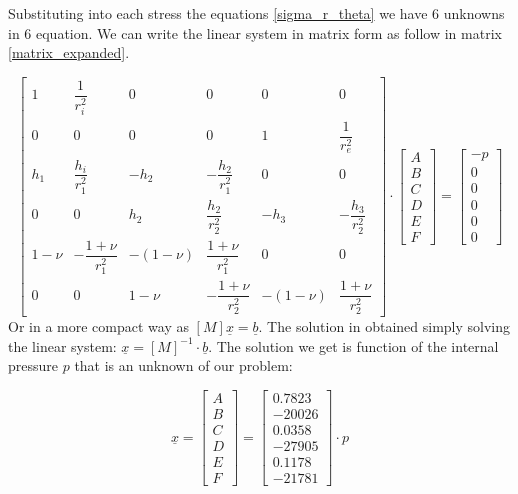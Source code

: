 \documentclass[a4paper,12pt]{article}
\begin{document}
Substituting into each stress the equations \ref{sigma_r_theta} we have 6 unknowns in 6 equation. We can write the linear system in matrix form as follow in matrix \ref{matrix_expanded}.

\begingroup
\renewcommand*{\arraystretch}{2}
\begin{equation}
\label{matrix_expanded}
\begin{bmatrix}
1     & \dfrac{1}{r_i^2}      & 0        & 0                    & 0        & 0                   \\
0     & 0                    & 0        & 0                    & 1        & \dfrac{1}{r_e^2}     \\
h_1   & \dfrac{h_i}{r_1^2}    & -h_2     & -\dfrac{h_2}{r_1^2}   & 0        & 0                   \\
0     & 0                    & h_2      & \dfrac{h_2}{r_2^2}    & -h_3     & -\dfrac{h_3}{r_2^2}  \\
1-\nu & -\dfrac{1+\nu}{r_1^2} & -(1-\nu) & \dfrac{1+\nu}{r_1^2}  & 0        & 0                   \\
0     & 0                    & 1-\nu    & -\dfrac{1+\nu}{r_2^2} & -(1-\nu) & \dfrac{1+\nu}{r_2^2}
\end{bmatrix}
\cdot
\begin{bmatrix}
A\\ B\\ C\\ D\\ E\\ F
\end{bmatrix}
=
\begin{bmatrix}
-p\\ 0\\ 0\\ 0\\ 0\\ 0
\end{bmatrix}
\end{equation}
\endgroup
%
Or in a more compact way as $[M]\underline{x}=\underline{b}$. The solution in obtained simply solving the linear system: $\underline{x}=[M]^{-1}\cdot\underline{b}$. The solution we get is function of the internal pressure $p$ that is an unknown of our problem:

\begin{equation}
\underline{x} 
=
\begin{bmatrix}
A\\ B\\ C\\ D\\ E\\ F
\end{bmatrix}
=
\begin{bmatrix}
0.7823\\ -20026\\ 0.0358\\ -27905\\ 0.1178\\ -21781
\end{bmatrix}
\cdot p
\end{equation}
\end{document}
